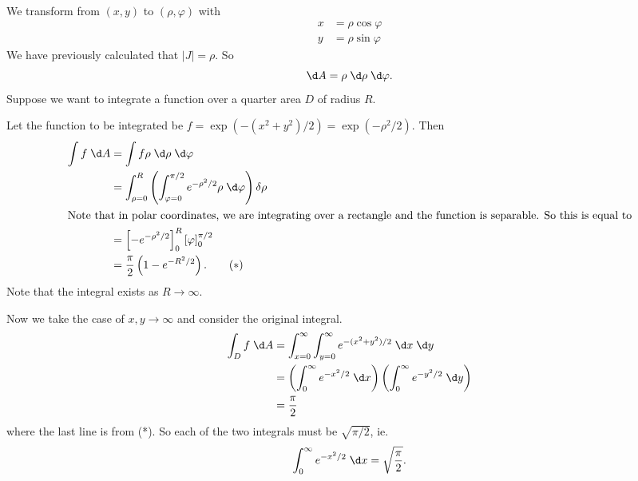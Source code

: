 \documentclass[a4paper]{article}
\begin{document}
\begin{eg}
  We transform from $(x, y)$ to $(\rho, \varphi)$ with
  \begin{align*}
    x &= \rho\cos \varphi\\
    y &= \rho\sin \varphi
  \end{align*}
  We have previously calculated that $|J| = \rho$. So
  \[
    \d A = \rho \;\d \rho \;\d \varphi.
  \]
  Suppose we want to integrate a function over a quarter area $D$ of radius $R$.
  \begin{center}
  \end{center}
  Let the function to be integrated be $f = \exp(-(x^2 + y^2)/2) = \exp(-\rho^2/2)$. Then
  \begin{align*}
    \int f\;\d A &= \int f\rho\;\d\rho\;\d\varphi\\
    &=\int_{\rho=0}^R\left(\int_{\varphi=0}^{\pi/2}e^{-\rho^2/2}\rho \;\d \varphi\right)\delta \rho\\
    \intertext{Note that in polar coordinates, we are integrating over a rectangle and the function is separable. So this is equal to}
    &= \left[-e^{-\rho^2/2}\right]^R_0\left[\varphi\right]_0^{\pi/2}\\
    &= \frac{\pi}{2}\left( 1 - e^{-R^2/2}\right).\tag{$*$}
  \end{align*}
  Note that the integral exists as $R\to \infty$.

  Now we take the case of $x, y\to \infty$ and consider the original integral.
  \begin{align*}
    \int _D f\;\d A &= \int_{x = 0}^{\infty} \int_{y=0}^\infty e^{-(x^2 + y^2)/2}\;\d x\;\d y\\
    &= \left(\int_0^\infty e^{-x^2/2}\;\d x\right)\left(\int_0^\infty e^{-y^2/2}\;\d y\right)\\
    &= \frac{\pi}{2}
  \end{align*}
  where the last line is from (*). So each of the two integrals must be $\sqrt{\pi/2}$, ie.
  \[
    \int_0^\infty e^{-x^2/2}\;\d x = \sqrt{\frac{\pi}{2}}.
  \]

\end{eg}
\end{document}
